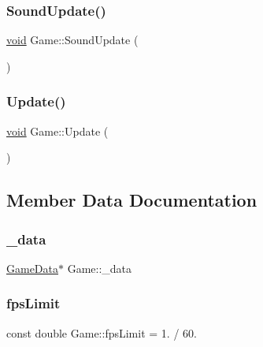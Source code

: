 \mbox{\label{classGame_a354ce6e35d03d24914d1ec79a85ce2c4}} 
\subsubsection{\texorpdfstring{Sound\+Update()}{SoundUpdate()}}
{\footnotesize\ttfamily \hyperlink{imgui__impl__opengl3__loader_8h_ac668e7cffd9e2e9cfee428b9b2f34fa7}{void} Game\+::\+Sound\+Update (\begin{DoxyParamCaption}{ }\end{DoxyParamCaption})}

\mbox{\label{classGame_a1c5373c68261c54aff03e6abe40fee52}} 
\subsubsection{\texorpdfstring{Update()}{Update()}}
{\footnotesize\ttfamily \hyperlink{imgui__impl__opengl3__loader_8h_ac668e7cffd9e2e9cfee428b9b2f34fa7}{void} Game\+::\+Update (\begin{DoxyParamCaption}{ }\end{DoxyParamCaption})}



\subsection{Member Data Documentation}
\mbox{\label{classGame_a640913b0033d92e52b6197e1b61f5d23}} 
\subsubsection{\texorpdfstring{\+\_\+data}{\_data}}
{\footnotesize\ttfamily \hyperlink{structGameData}{Game\+Data}$\ast$ Game\+::\+\_\+data\hspace{0.3cm}{\ttfamily [private]}}

\mbox{\label{classGame_a269338b3fe217f7cf207d95685c51033}} 
\subsubsection{\texorpdfstring{fps\+Limit}{fpsLimit}}
{\footnotesize\ttfamily const double Game\+::fps\+Limit = 1. / 60.\hspace{0.3cm}{\ttfamily [private]}}


